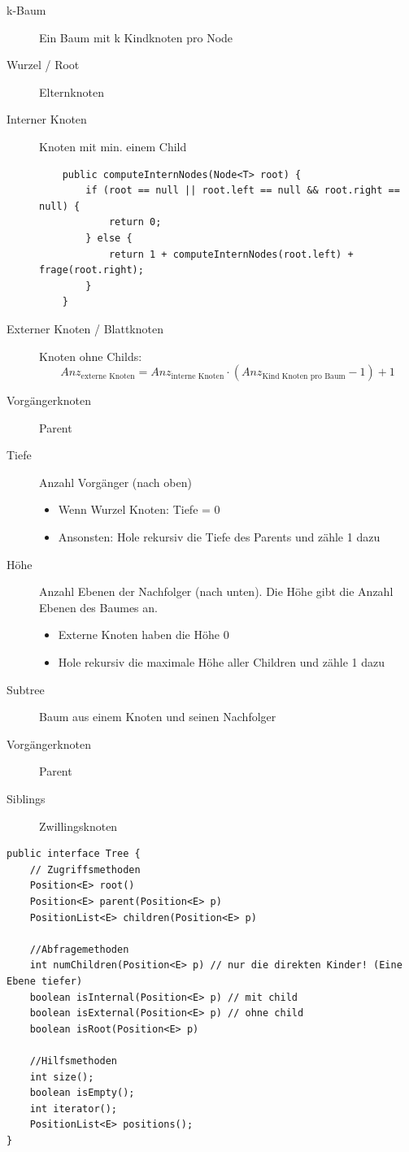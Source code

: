 \begin{description}
	\item[k-Baum] Ein Baum mit k Kindknoten pro Node
	\item[Wurzel / Root] Elternknoten
	\item[Interner Knoten] Knoten mit min. einem Child
	\begin{lstlisting}
	public computeInternNodes(Node<T> root) {
		if (root == null || root.left == null && root.right == null) {
			return 0;
		} else {
			return 1 + computeInternNodes(root.left) + frage(root.right);
		}
	}
	\end{lstlisting}
	\item[Externer Knoten / Blattknoten] Knoten ohne Childs: 
	\[
		Anz_{\text{externe Knoten}} = Anz_{\text{interne Knoten}} \cdot (Anz_{\text{Kind Knoten pro Baum}} -1) + 1
	\]
	\item[Vorgängerknoten] Parent
	\item[Tiefe] Anzahl Vorgänger (nach oben)
	\begin{itemize}
		\item Wenn Wurzel Knoten: Tiefe = 0
		\item Ansonsten: Hole rekursiv die Tiefe des Parents und zähle 1 dazu
	\end{itemize}
	\item[Höhe] Anzahl Ebenen der Nachfolger (nach unten). Die Höhe gibt die Anzahl Ebenen des Baumes an.
	\begin{itemize}
		\item Externe Knoten haben die Höhe 0
		\item Hole rekursiv die maximale Höhe aller Children und zähle 1 dazu
	\end{itemize}
	\item[Subtree] Baum aus einem Knoten und seinen Nachfolger
	\item[Vorgängerknoten] Parent
	\item[Siblings] Zwillingsknoten
\end{description}

\begin{lstlisting}
public interface Tree {
	// Zugriffsmethoden
	Position<E> root()
	Position<E> parent(Position<E> p)
	PositionList<E> children(Position<E> p)

	//Abfragemethoden
	int numChildren(Position<E> p) // nur die direkten Kinder! (Eine Ebene tiefer)
	boolean isInternal(Position<E> p) // mit child
	boolean isExternal(Position<E> p) // ohne child
	boolean isRoot(Position<E> p)
	
	//Hilfsmethoden
	int size();
	boolean isEmpty();
	int iterator();
	PositionList<E> positions();
}
\end{lstlisting}

